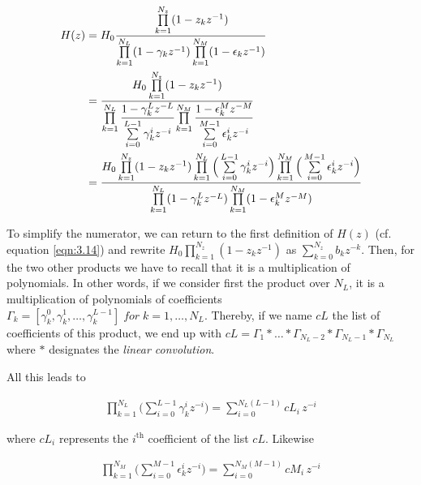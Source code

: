 \begin{equation}
	\begin{aligned}
H(z) &= H_0\cfrac{\prod\limits_{k=1}^{N_z} (1 - z_k z^{-1} )}{\prod\limits_{k=1}^{N_L} (1 - \gamma_k z^{-1})\prod\limits_{k=1}^{N_M} (1 - \epsilon_k z^{-1})} \\ 
&= \cfrac{H_0\prod\limits_{k=1}^{N_z} (1 - z_k z^{-1} )}{\prod\limits_{k=1}^{N_L} \cfrac{1 - \gamma_k^L z^{-L}}{\sum\limits_{i=0}^{L-1}\gamma_k^i z^{-i}} \prod\limits_{k=1}^{N_M} \cfrac{1 - \epsilon_k^M z^{-M}}{\sum\limits_{i=0}^{M-1}\epsilon_k^i z^{-i}}} \\
& = \cfrac{H_0\prod\limits_{k=1}^{N_z} (1 - z_k z^{-1} ) \prod\limits_{k=1}^{N_L}\Big (\sum\limits_{i=0}^{L-1}\gamma_k^i z^{-i} \Big )\prod\limits_{k=1}^{N_M} \Big (\sum\limits_{i=0}^{M-1}\epsilon_k^i z^{-i} \Big )}{\prod\limits_{k=1}^{N_L} (1 - \gamma_k^L z^{-L}) \prod\limits_{k=1}^{N_M} (1 - \epsilon_k^M z^{-M}) }
\label{eqn:3.18}
	\end{aligned}
\end{equation}

To simplify the numerator, we can return to the first definition of $H(z)$ (cf. equation \ref{eqn:3.14}) and rewrite $H_0\prod\limits_{k=1}^{N_z} (1 - z_k z^{-1})$ as $\sum\limits_{k=0}^{N_z} b_kz^{-k}$.
Then, for the two other products we have to recall that it is a multiplication of polynomials. In other words, if we consider first the product over $N_L$, it is a multiplication of polynomials of coefficients $\Gamma_k = [\gamma_k^0, \gamma_k^1, \dots, \gamma_k^{L-1}] \;for\; k = 1, \dots, N_L$. Thereby, if we name $cL$ the list of coefficients of this product, we end up with $cL = \Gamma_1*\dots*\Gamma_{N_L-2}*\Gamma_{N_L-1}*\Gamma_{N_L}$where $*$ designates the \textit{linear convolution}. 

All this leads to 

\begin{align}
	\prod\limits_{k=1}^{N_L}\Big (\sum\limits_{i=0}^{L-1}\gamma_k^i z^{-i} \Big ) = \sum\limits_{i=0}^{N_L(L-1)}cL_i\,z^{-i}
	\label{eqn:3.19}
\end{align}

where $cL_i$ represents the $i^{\text{th}}$ coefficient of the list $cL$. Likewise

\begin{align}
\prod\limits_{k=1}^{N_M}\Big (\sum\limits_{i=0}^{M-1}\epsilon_k^i z^{-i} \Big ) = \sum\limits_{i=0}^{N_M(M-1)}cM_i\,z^{-i}
\label{eqn:3.20}
\end{align}

